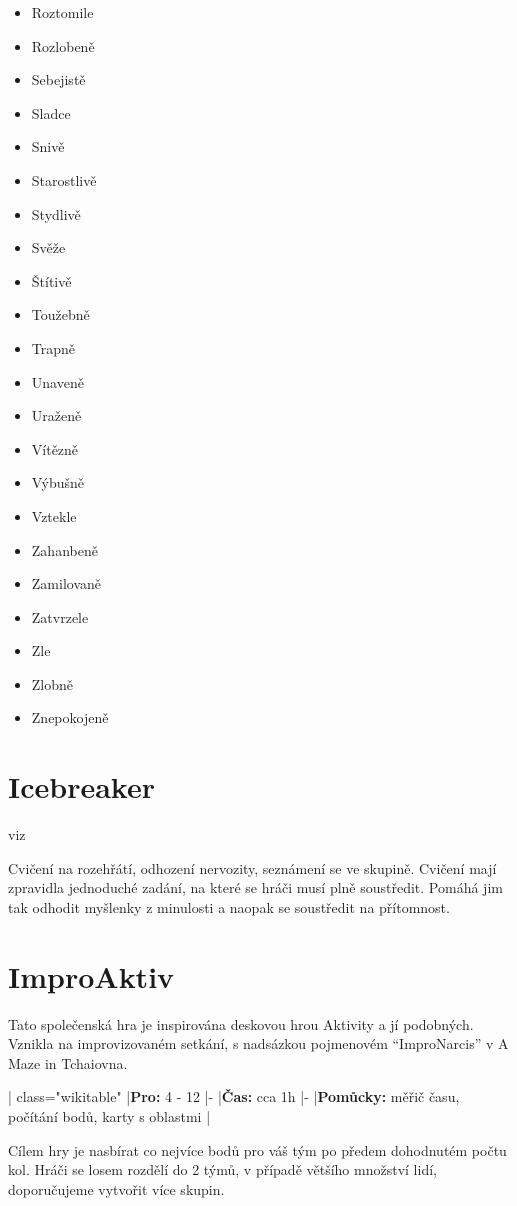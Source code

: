 \documentclass[main.tex]{subfiles}
\begin{document}
\begin{multicols}{3}
\begin{itemize}
\item  Roztomile
\item  Rozlobeně
\item  Sebejistě
\item  Sladce
\item  Snivě
\item  Starostlivě
\item  Stydlivě
\item  Svěže
\item  Štítivě
\item  Toužebně
\item  Trapně
\item  Unaveně
\item  Uraženě
\item  Vítězně
\item  Výbušně
\item  Vztekle
\item  Zahanbeně
\item  Zamilovaně
\item  Zatvrzele
\item  Zle
\item  Zlobně
\item  Znepokojeně
\end{itemize}
\end{multicols} 
 
\needspace{5cm} \section{Icebreaker} \label{icebreaker} viz  
 
Cvičení na rozehřátí, odhození nervozity, seznámení se ve skupině. Cvičení mají zpravidla jednoduché zadání, na které se hráči musí plně soustředit. Pomáhá jim tak odhodit myšlenky z minulosti a naopak se soustředit na přítomnost. 
\needspace{5cm} \section{ImproAktiv} \label{improaktiv} Tato společenská hra je inspirována deskovou hrou Aktivity a jí podobných. Vznikla na improvizovaném setkání, s nadsázkou pojmenovém “ImproNarcis” v A Maze in Tchaiovna. 
 
{| class="wikitable" 
|\textbf{Pro:}{} 4  - 12 
|- 
|\textbf{Čas:}{} cca 1h 
|- 
|\textbf{Pomůcky:}{} měřič času, počítání bodů, karty s oblastmi 
|} 
 
Cílem hry je nasbírat co nejvíce bodů pro váš tým po předem dohodnutém počtu kol. Hráči se losem rozdělí do 2 týmů, v případě většího množství lidí, doporučujeme vytvořit více skupin. 
 
\end{document}
